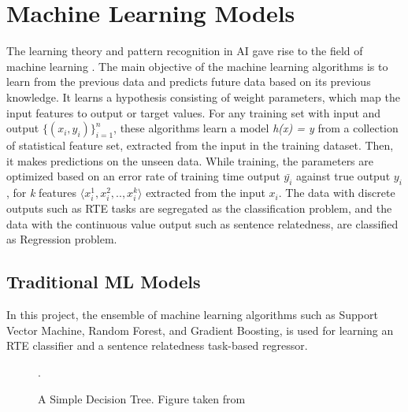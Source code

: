 \documentclass[12pt]{report} %
\begin{document}
\section{Machine Learning Models}
\label{ml_model}

The learning theory and pattern recognition in AI gave rise to the field of machine learning \citep{jurafsky2014speech}. The main objective of the machine learning algorithms is to learn from the previous data and predicts future data based on its previous knowledge. It learns a hypothesis consisting of weight parameters, which map the input features to output or target values. For any training set with input and output $\{(x_{i},y_{i})\}_{i=1}^{n}$, these algorithms learn a model \textit{h(x) = y} from a collection of statistical feature set, extracted from the input in the training dataset. Then, it makes predictions on the unseen data.  While training, the parameters are optimized based on an error rate of training time output $\bar{y_{i}}$ against true output $y_{i}$, for \textit{k} features $ \langle x^{1}_{i} ,x^{2}_{i},..,x^{k}_{i} \rangle  $ extracted from the input $x_{i}  $. The data with discrete outputs such as RTE tasks are segregated as the classification problem, and  the data with the continuous value output such as sentence relatedness, are classified as Regression problem. 

\subsection{Traditional ML Models}

In this project, the ensemble of machine learning algorithms such as Support Vector Machine, Random Forest, and Gradient Boosting, is used for learning an RTE classifier and a sentence relatedness task-based regressor. 

\begin{figure}[!tbp]
	\centering
	\caption{A Simple Decision Tree. Figure taken from \cite{miller1991contextual}}.
	\label{tree}
\end{figure}
\end{document}

